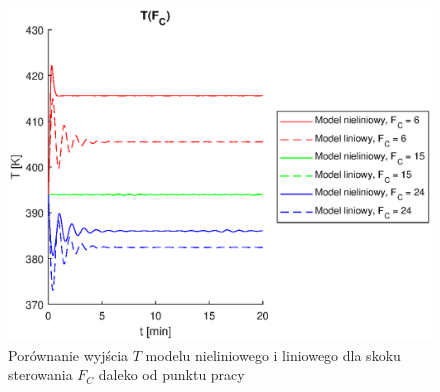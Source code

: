 \begin{figure}
	\centering
	\includegraphics[width=.8\linewidth]{plot/lin_tfc_1.eps}
	\caption{Porównanie wyjścia $T$ modelu nieliniowego i liniowego dla skoku sterowania $F_C$ daleko od punktu pracy}
	\label{fig:lintfc1}
\end{figure}
